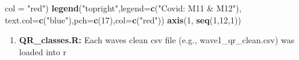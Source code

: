 \documentclass[
]{book}
\newenvironment{Shaded}{\begin{snugshade}}{\end{snugshade}}
\newcommand{\DataTypeTok}[1]{\textcolor[rgb]{0.13,0.29,0.53}{#1}}
\newcommand{\DecValTok}[1]{\textcolor[rgb]{0.00,0.00,0.81}{#1}}
\newcommand{\KeywordTok}[1]{\textcolor[rgb]{0.13,0.29,0.53}{\textbf{#1}}}
\newcommand{\NormalTok}[1]{#1}
\newcommand{\StringTok}[1]{\textcolor[rgb]{0.31,0.60,0.02}{#1}}
\providecommand{\tightlist}{%
  \setlength{\itemsep}{0pt}\setlength{\parskip}{0pt}}
\begin{document}
\begin{Shaded}
\begin{Highlighting}[]
     \DataTypeTok{col =} \StringTok{"red"}\NormalTok{)}
\KeywordTok{legend}\NormalTok{(}\StringTok{"topright"}\NormalTok{,}\DataTypeTok{legend=}\KeywordTok{c}\NormalTok{(}\StringTok{"Covid: M11 & M12"}\NormalTok{),}
       \DataTypeTok{text.col=}\KeywordTok{c}\NormalTok{(}\StringTok{"blue"}\NormalTok{),}\DataTypeTok{pch=}\KeywordTok{c}\NormalTok{(}\DecValTok{17}\NormalTok{),}\DataTypeTok{col=}\KeywordTok{c}\NormalTok{(}\StringTok{"red"}\NormalTok{))}
\KeywordTok{axis}\NormalTok{(}\DecValTok{1}\NormalTok{, }\KeywordTok{seq}\NormalTok{(}\DecValTok{1}\NormalTok{,}\DecValTok{12}\NormalTok{,}\DecValTok{1}\NormalTok{))}
\end{Highlighting}
\end{Shaded}

\begin{enumerate}
\def\labelenumi{\arabic{enumi}.}
\setcounter{enumi}{8}
\tightlist
\item
  \textbf{QR\_classes.R:} Each waves clean csv file (e.g., wave1\_qr\_clean.csv) was loaded into r
\end{enumerate}
\end{document}

